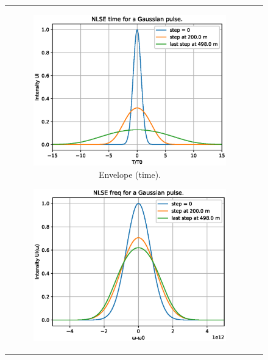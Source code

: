          \begin{figure}[label={fig:n1pb}, caption={Solution of the NLSE using SSFM for N=1 and $\beta_2 > 0$.}]
         \centering	
         \begin{tabular}[c]{cc}
         \centering	
        \begin{subfigure}[b]{.53\textwidth}
        \centering	
            \includegraphics[width=1\textwidth]{figures/chap3/SSFM/eN1bt.eps}
            \caption{Envelope (time).}
            \label{fig:eN1bt}
        \end{subfigure}
        \begin{subfigure}[b]{.53\textwidth}
		    \centering	
            \includegraphics[width=1\textwidth]{figures/chap3/SSFM/eN1bs.eps}

\end{subfigure}
\end{tabular}
\end{figure}
